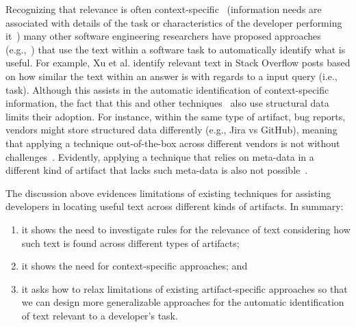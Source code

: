 Recognizing that relevance is often context-specific~\cite{Bavota2016} (information needs are associated with details of the task 
or characteristics of the developer performing it~\cite{Robillard2015}) many other software engineering researchers 
have proposed approaches (e.g.,~\cite{Ye2016, silva2019, Xu2017}) that 
use the text within a software task 
to automatically identify what is useful.
For example, Xu et al. identify relevant text in Stack Overflow posts 
based on how similar the text within an answer is with regards to a input query (i.e., task).
Although this assists in the automatic identification of context-specific information, 
the fact that this and other techniques~\cite{silva2019, Li2018}
also use structural data limits their adoption. 
For instance, within the same type of artifact, bug reports,
vendors might store structured data differently (e.g., Jira vs GitHub),
meaning that applying a technique 
 out-of-the-box across different vendors is not without challenges~\cite{Bavota2016}.
Evidently, applying a technique that relies on 
meta-data in a different kind of artifact that lacks such meta-data
is also not possible~\cite{arnaoudova2015}.




The discussion above  evidences limitations of existing techniques for
assisting developers in locating useful text across different kinds of artifacts.
In summary:

\begin{enumerate}
    \item it shows the need to investigate rules for the relevance of text 
    considering how such text is found across different types of artifacts;
    \item it shows the need for context-specific approaches; and 
    \item it asks how to relax limitations of existing
    artifact-specific approaches so that we can design 
    more generalizable approaches for the automatic identification
    of text relevant to a developer's task.
\end{enumerate}


